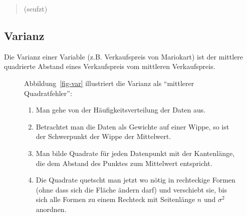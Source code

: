 \documentclass[
  letterpaper,
  oneside,
  open=any]{scrbook}
\providecommand{\tightlist}{%
  \setlength{\itemsep}{0pt}\setlength{\parskip}{0pt}}\usepackage{longtable,booktabs,array}
\theoremstyle{definition}
\theoremstyle{definition}
\theoremstyle{definition}
\theoremstyle{remark}
\begin{document}
\begin{quote}
{} (seufzt)
\end{quote}

\subsection{Varianz}\label{varianz}

Die Varianz einer Variable (z.B. Verkaufspreis von Mariokart) ist der
mittlere quadrierte Abstand eines Verkaufspreis vom mittleren
Verkaufspreis.

\begin{figure}

\begin{minipage}{0.60\linewidth}
Abbildung~\ref{fig-var} illustriert die Varianz als \enquote{mittlerer
Quadratfehler}:

\begin{enumerate}
\def\labelenumi{\arabic{enumi}.}
\tightlist
\item
  Man gehe von der Häufigkeitsverteilung der Daten aus.
\item
  Betrachtet man die Daten als Gewichte auf einer Wippe, so ist der
  Schwerpunkt der Wippe der Mittelwert.
\item
  Man bilde Quadrate für jeden Datenpunkt mit der Kantenlänge, die dem
  Abstand des Punktes zum Mittelwert entspricht.
\item
  Die Quadrate quetscht man jetzt wo nötig in rechteckige Formen (ohne
  dass sich die Fläche ändern darf) und verschiebt sie, bis sich alle
  Formen zu einem Rechteck mit Seitenlänge \(n\) und \(\sigma^2\)
  anordnen.
\end{enumerate}

\end{minipage}%
%
\begin{minipage}{0.40\linewidth}

\begin{figure}[H]

\centering{

}
\end{figure}
\end{minipage}
\end{figure}
\end{document}
